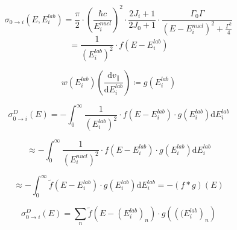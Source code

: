 \documentclass{article}
\begin{document}
\begin{equation}
\label{convolution_f_1}
\sigma_{0 \to i} (E, E_i^{lab}) = \frac{\pi}{2} \cdot \left( \frac{\hbar c}{E_i^{nucl}} \right)^2 \cdot \frac{2 J_i + 1}{2 J_0 + 1} \cdot \frac{\Gamma_0 \Gamma}{\left( E - E_i^{nucl} \right)^2 + \frac{\Gamma^2}{4}} 
\end{equation}
\begin{equation}
= \frac{1}{\left( E_i^{lab} \right)^2} \cdot f\left( E - E^{lab}_i \right)
\end{equation}

\begin{equation}
\label{convolution_g}
	w \left( E^{lab}_i \right)\left( \frac{\mathrm{d} v_\parallel}{\mathrm{d} E_i^{lab}} \right) \coloneqq g \left( E^{lab}_i \right)
\end{equation}

\begin{equation}
\label{convolution_approximation_1}
\sigma^{D}_{0 \to i} (E) = - \int_{0}^{\infty} \frac{1}{\left( E_i^{lab} \right)^2} \cdot f\left( E - E^{lab}_i \right) \cdot g \left( E^{lab}_i \right) \mathrm{d} E_i^{lab}
\end{equation}

\begin{equation}
\label{convolution_approximation_2}
\approx - \int_{0}^{\infty} \frac{1}{\left( E_i^{nucl} \right)^2} \cdot f\left( E - E^{lab}_i \right) \cdot g \left( E^{lab}_i \right) \mathrm{d} E_i^{lab}
\end{equation}

\begin{equation}
\label{convolution_approximation_3}
	\approx - \int_{0}^{\infty} \tilde{f}\left( E - E^{lab}_i \right) \cdot g \left( E^{lab}_i \right) \mathrm{d} E_i^{lab} = -\left( f * g \right) \left( E \right)
\end{equation}

\begin{equation}
\label{discrete_convolution}
	\sigma^{D}_{0 \to i} (E) = \sum_n \tilde{f} \left( E -  \left(E^{lab}_i\right)_n \right) \cdot g \left( \left( (E^{lab}_i\right)_n \right)
\end{equation}
\newpage

{}

\end{document}
